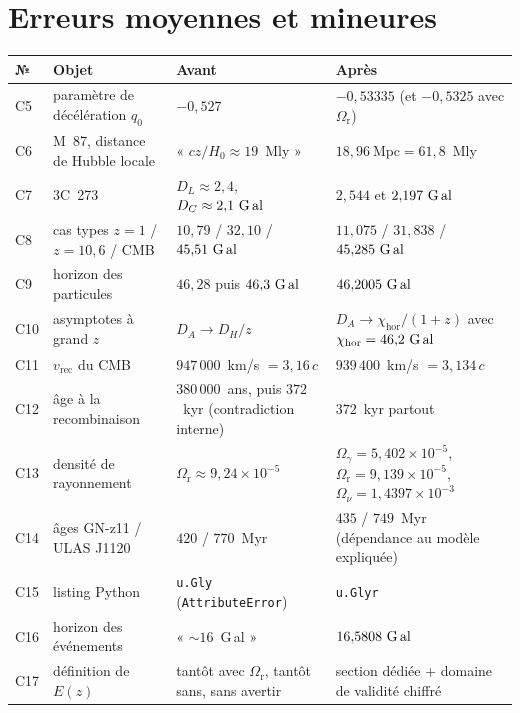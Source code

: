 \documentclass[11pt,a4paper]{report}
\newcommand{\Gly}{\text{G\,al}}
\newcommand{\Mpc}{\text{Mpc}}
\newcommand{\Or}{\Omega_{\mathrm{r}}}
\newcommand{\Hzero}{H_{0}}
\begin{document}
\section{Erreurs moyennes et mineures}

\begin{center}
\footnotesize
\renewcommand{\arraystretch}{1.3}
\begin{longtable}{p{0.7cm}p{5.3cm}p{4.1cm}p{4.6cm}}
\toprule
\textbf{№} & \textbf{Objet} & \textbf{Avant} & \textbf{Après} \\
\midrule
\endhead
C5 & paramètre de décélération $q_{0}$ & $-0{,}527$ &
     $-0{,}53335$ (et $-0{,}5325$ avec $\Or$) \\
C6 & M~87, distance de Hubble locale & « $cz/\Hzero \approx 19$~Mly » &
     $18{,}96~\Mpc = 61{,}8$~Mly \\
C7 & 3C~273 & $D_{L}\approx2{,}4$, $D_{C}\approx2{,}1~\Gly$ &
     $2{,}544$ et $2{,}197~\Gly$ \\
C8 & cas types $z=1$ / $z=10{,}6$ / CMB &
     $10{,}79$ / $32{,}10$ / $45{,}51~\Gly$ &
     $11{,}075$ / $31{,}838$ / $45{,}285~\Gly$ \\
C9 & horizon des particules & $46{,}28$ puis $46{,}3~\Gly$ & $46{,}2005~\Gly$ \\
C10 & asymptotes à grand $z$ & $D_{A}\to D_{H}/z$ &
     $D_{A}\to\chi_{\text{hor}}/(1+z)$ avec $\chi_{\text{hor}}=46{,}2~\Gly$ \\
C11 & $v_{\text{rec}}$ du CMB & $947\,000$~km/s $=3{,}16\,c$ &
     $939\,400$~km/s $=3{,}134\,c$ \\
C12 & âge à la recombinaison & $380\,000$~ans, puis $372$~kyr
     (contradiction interne) & $372$~kyr partout \\
C13 & densité de rayonnement & $\Or\approx9{,}24\times10^{-5}$ &
     $\Omega_{\gamma}=5{,}402\times10^{-5}$, $\Or=9{,}139\times10^{-5}$,
     $\Omega_{\nu}=1{,}4397\times10^{-3}$ \\
C14 & âges GN-z11 / ULAS J1120 & $420$ / $770$~Myr &
     $435$ / $749$~Myr (dépendance au modèle expliquée) \\
C15 & listing Python & \texttt{u.Gly} (\texttt{AttributeError}) &
     \texttt{u.Glyr} \\
C16 & horizon des événements & « $\sim16$~G\,al » & $16{,}5808~\Gly$ \\
C17 & définition de $E(z)$ & tantôt avec $\Or$, tantôt sans, sans avertir &
     section dédiée + domaine de validité chiffré \\
\bottomrule
\end{longtable}
\end{center}
\end{document}
